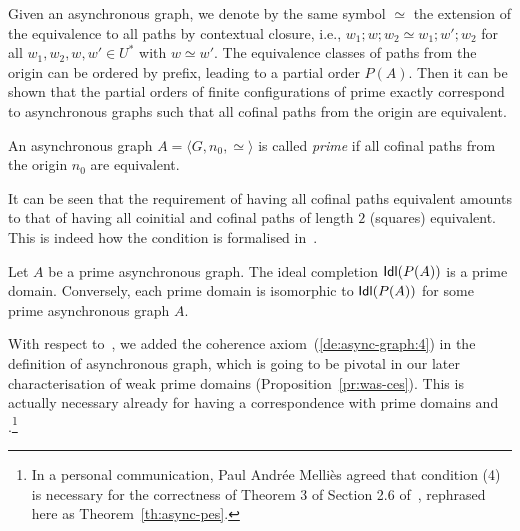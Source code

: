Given an asynchronous graph, we denote by the same symbol $\simeq$ the
extension of the equivalence to all paths by contextual closure, i.e.,
$w_1;w;w_2 \simeq w_1;w';w_2$ for all $w_1, w_2, w, w' \in U^*$ with $w \simeq w'$.
%
The equivalence
classes of paths from the origin can be ordered by prefix, leading to
a partial order $P(A)$.
%
Then it can be shown that the partial orders of finite configurations
of prime {\esabbr} exactly correspond to asynchronous graphs such
that all cofinal paths from the origin are %
equivalent.

\begin{definition}
  An asynchronous graph 
  $A = \langle G, n_0, \simeq \rangle$ is called  \emph{prime} if 
  all cofinal paths from the origin $n_0$ are equivalent.
\end{definition}

It can be seen that the requirement of having all cofinal paths equivalent amounts to that of having all {coinitial and cofinal} paths of length $2$ (squares) equivalent. This is indeed how the condition is formalised in~\cite{PU:RMC}.

\begin{theorem}
  \label{th:async-pes}
  Let $A$ be a prime asynchronous graph. The ideal completion
  $\mathsf{Idl}({P(A)})$ is a prime domain. Conversely, each
  prime domain is isomorphic to $\mathsf{Idl}({P(A)})$ for some prime
  asynchronous graph $A$.
\end{theorem}

With respect to~\cite{Mel:hab},
we added the coherence
axiom~(\ref{de:async-graph:4}) in the definition of
asynchronous graph, which
is going to be pivotal in our later characterisation of weak prime domains (Proposition~\ref{pr:was-ces}). This is actually necessary already for having a correspondence with
prime domains and {\esabbr}.\footnote{In a personal communication, Paul Andr\'ee Melli\`es agreed that condition (4) is necessary for the correctness of Theorem 3 of Section 2.6 of~\cite{Mel:hab},
rephrased here as Theorem~\ref{th:async-pes}.
}

